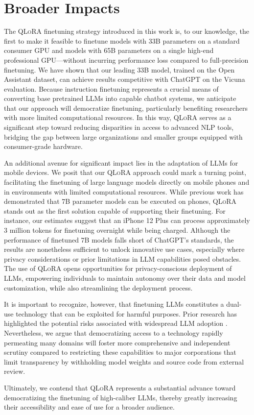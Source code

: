 \section{Broader Impacts}

The \textsc{QLoRA} finetuning strategy introduced in this work is, to our knowledge, the first to make it feasible to finetune models with 33B parameters on a standard consumer GPU and models with 65B parameters on a single high-end professional GPU—without incurring performance loss compared to full-precision finetuning. We have shown that our leading 33B model, trained on the Open Assistant dataset, can achieve results competitive with ChatGPT on the Vicuna evaluation. Because instruction finetuning represents a crucial means of converting base pretrained LLMs into capable chatbot systems, we anticipate that our approach will democratize finetuning, particularly benefiting researchers with more limited computational resources. In this way, \textsc{QLoRA} serves as a significant step toward reducing disparities in access to advanced NLP tools, bridging the gap between large organizations and smaller groups equipped with consumer-grade hardware.

An additional avenue for significant impact lies in the adaptation of LLMs for mobile devices. We posit that our \textsc{QLoRA} approach could mark a turning point, facilitating the finetuning of large language models directly on mobile phones and in environments with limited computational resources. While previous work has demonstrated that 7B parameter models can be executed on phones, \textsc{QLoRA} stands out as the first solution capable of supporting their finetuning. For instance, our estimates suggest that an iPhone 12 Plus can process approximately 3 million tokens for finetuning overnight while being charged. Although the performance of finetuned 7B models falls short of ChatGPT’s standards, the results are nonetheless sufficient to unlock innovative use cases, especially where privacy considerations or prior limitations in LLM capabilities posed obstacles. The use of \textsc{QLoRA} opens opportunities for privacy-conscious deployment of LLMs, empowering individuals to maintain autonomy over their data and model customization, while also streamlining the deployment process.

It is important to recognize, however, that finetuning LLMs constitutes a dual-use technology that can be exploited for harmful purposes. Prior research has highlighted the potential risks associated with widespread LLM adoption \citep{bommasani2021opportunities,bender2021dangers}. Nevertheless, we argue that democratizing access to a technology rapidly permeating many domains will foster more comprehensive and independent scrutiny compared to restricting these capabilities to major corporations that limit transparency by withholding model weights and source code from external review.

Ultimately, we contend that \textsc{QLoRA} represents a substantial advance toward democratizing the finetuning of high-caliber LLMs, thereby greatly increasing their accessibility and ease of use for a broader audience.